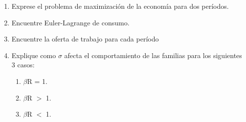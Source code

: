 \documentclass[a4paper,12pt]{article}
\begin{document}
\begin{enumerate}[label=\alph*)]

\item Exprese el problema de maximización de la economía para dos períodos.
\item Encuentre Euler-Lagrange de consumo.
\item Encuentre la oferta de trabajo para cada período
\item Explique como $\sigma$ afecta el comportamiento de las familias para los siguientes 3 casos:
\begin{enumerate}[label=\alph*.\arabic*)]
        \item $\beta$R = 1.
        \item $\beta$R $>$ 1.
        \item $\beta$R $<$ 1.
    \end{enumerate}



\end{enumerate}
\end{document}
